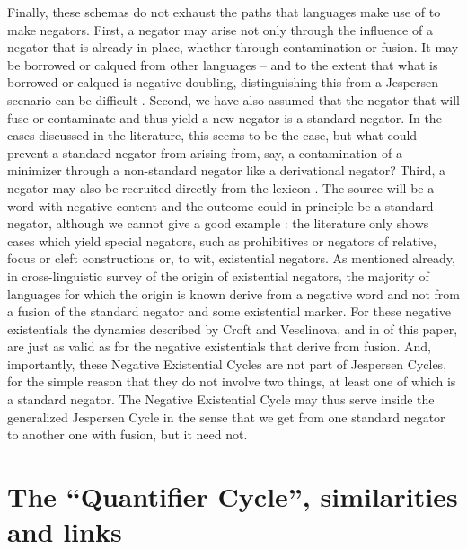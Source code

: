 ﻿\documentclass[output=paper,draft,draftmode,colorlinks,citecolor=brown]{langscibook}
\begin{document}
Finally, these schemas do not exhaust the paths that languages make use of
to make negators. First, a negator may arise not only through the influence
of a negator that is already in place, whether through contamination or
fusion. It may be borrowed or calqued from other languages – and to the
extent that what is borrowed or calqued is negative doubling,
distinguishing this from a Jespersen scenario can be difficult 
\parencite[cp.][]{AuweraVossen2015}. Second, we have also assumed that the
negator
that will fuse or contaminate and thus yield a new negator is a standard
negator. In the cases discussed in the literature, this seems to be the
case, but what could prevent a standard negator from arising from, say, a
contamination of a minimizer through a non-standard negator like a
derivational negator? Third, a negator may also be recruited directly from
the lexicon \parencite[cp.][74]{Auwera2010}. The source will be a
word with negative content and the outcome could in principle be a standard
negator, although we cannot give a good example
\parencite[cp.][75, 90--91]{Auwera2010}: the literature
\parencite[e.g.][292--339]{Gelderen2011} only shows cases which yield special
negators, such as prohibitives or negators of relative, focus or cleft
constructions \citep[917]{Givon1973} or, to wit, existential negators. As
mentioned already, in  cross-linguistic survey of
the origin of existential negators, the majority of languages for which the
origin is known derive from a negative word and not from a fusion of the
standard negator and some existential marker. For these negative
existentials the dynamics described by Croft and Veselinova, and in
 of this paper, are just as valid as for the negative
existentials that derive from fusion. And, importantly, these Negative
Existential Cycles are not part of Jespersen Cycles, for the simple reason
that they do not involve two things, at least one of which is a standard
negator. The Negative Existential Cycle may thus serve inside the
generalized Jespersen Cycle in the sense that we get from one standard
negator to another one with fusion, but it need not.

\section{The ``Quantifier Cycle'', similarities and links}\label{sec:int-5}
\end{document}

